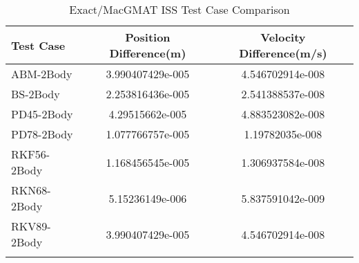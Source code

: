 \begin{table}[htbp!]
\centering
\caption{ Exact/MacGMAT ISS Test Case Comparison}
      \begin{tabular}{lcc}
      \hline\hline
          Test Case & Position Difference(m) & Velocity Difference(m/s) \\
         \hline
         ABM-2Body & 3.990407429e-005 & 4.546702914e-008 \\
         BS-2Body & 2.253816436e-005 & 2.541388537e-008 \\
         PD45-2Body & 4.29515662e-005 & 4.883523082e-008 \\
         PD78-2Body & 1.077766757e-005 & 1.19782035e-008 \\
         RKF56-2Body & 1.168456545e-005 & 1.306937584e-008 \\
         RKN68-2Body & 5.15236149e-006 & 5.837591042e-009 \\
         RKV89-2Body & 3.990407429e-005 & 4.546702914e-008 \\
      \hline\hline
      \label{Table: ISS Exact-MacGMAT Table} 
\end{tabular}
\end{table}
